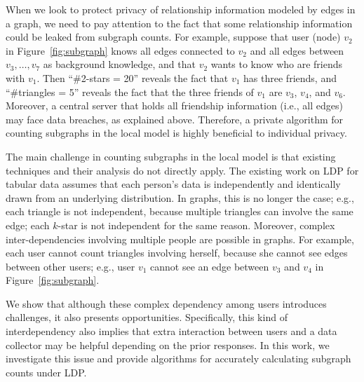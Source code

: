 When we look to protect privacy of relationship information modeled by edges in a graph, 
we need to pay attention to the fact 
that some relationship information 
could be leaked from subgraph counts. 
For example, 
suppose that user (node) $v_2$ in Figure~\ref{fig:subgraph} knows 
all edges connected to $v_2$ and 
all edges between $v_3, \ldots, v_7$ 
as background knowledge, and that $v_2$ wants to know who are friends with $v_1$. 
Then ``\#2-stars = 20'' reveals 
the fact that $v_1$ has three friends, and ``\#triangles = 5'' reveals 
the fact that the three friends of $v_1$ are $v_3$, $v_4$, and $v_6$. 
Moreover, a central server that holds all friendship information (i.e., all edges) may face data breaches, as explained above. 
Therefore, a private algorithm for counting subgraphs in the local model is highly beneficial to individual privacy.

The main challenge in counting subgraphs in the local model is that existing techniques and their analysis do not directly apply. 
The existing work on LDP for tabular data assumes that 
each person's data 
is independently and identically drawn from an underlying distribution. 
In graphs, this is no longer the case; e.g., 
each triangle is not independent, 
because multiple triangles can involve the same edge; 
each $k$-star is not independent for the same reason. 
Moreover, complex inter-dependencies involving multiple people 
are 
possible in graphs. 
For example, each user cannot count triangles involving herself, because she cannot see edges between other users; 
e.g., 
user 
$v_1$ cannot see an edge between $v_3$ and $v_4$ in Figure~\ref{fig:subgraph}. 

We show that although these complex dependency among users introduces challenges, it also presents opportunities. Specifically, this kind of interdependency also implies that extra interaction between users and a data collector may be helpful depending on the prior responses. 
In this work, we investigate this issue and provide algorithms for accurately calculating subgraph counts under LDP. 

